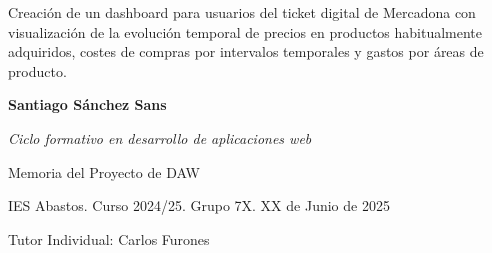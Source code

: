\documentclass[a4paper,12pt]{report}
\begin{document}
	
	

	
	
	
	\begin{titlepage}
		\begin{center}

			
			\vspace*{5cm} 

			\LARGE{Creación de un dashboard para usuarios del ticket digital de Mercadona con visualización de la evolución temporal de precios en productos habitualmente adquiridos, costes de compras por intervalos temporales y gastos por áreas de producto.}
			
			\vfill
			
		\begin{flushright}
			\large{\textbf{Santiago Sánchez Sans}}
			
			\large{\textit{Ciclo formativo en desarrollo de aplicaciones web}}
			
			\large{Memoria del Proyecto de DAW}
			
			\large{IES Abastos. Curso 2024/25. Grupo 7X. XX de Junio de 2025}
			
			\large{Tutor Individual: Carlos Furones}
		\end{flushright}

			
			
			
			
		\end{center}
	\end{titlepage}
	
	
	
	
	
	
	
	
	
\end{document}
